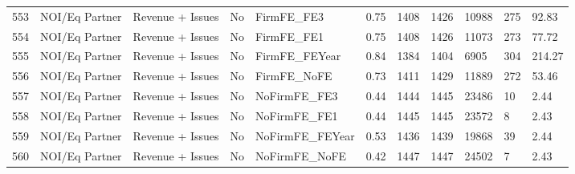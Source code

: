 \begin{table}[ht]
\begin{tabular}{rllllllllll}
  553 & NOI/Eq Partner & Revenue + Issues & No & FirmFE\_FE3 & 0.75 & 1408 & 1426 & 10988 & 275 & 92.83 \\ 
  554 & NOI/Eq Partner & Revenue + Issues & No & FirmFE\_FE1 & 0.75 & 1408 & 1426 & 11073 & 273 & 77.72 \\ 
  555 & NOI/Eq Partner & Revenue + Issues & No & FirmFE\_FEYear & 0.84 & 1384 & 1404 & 6905 & 304 & 214.27 \\ 
  556 & NOI/Eq Partner & Revenue + Issues & No & FirmFE\_NoFE & 0.73 & 1411 & 1429 & 11889 & 272 & 53.46 \\ 
  557 & NOI/Eq Partner & Revenue + Issues & No & NoFirmFE\_FE3 & 0.44 & 1444 & 1445 & 23486 & 10 & 2.44 \\ 
  558 & NOI/Eq Partner & Revenue + Issues & No & NoFirmFE\_FE1 & 0.44 & 1445 & 1445 & 23572 & 8 & 2.43 \\ 
  559 & NOI/Eq Partner & Revenue + Issues & No & NoFirmFE\_FEYear & 0.53 & 1436 & 1439 & 19868 & 39 & 2.44 \\ 
  560 & NOI/Eq Partner & Revenue + Issues & No & NoFirmFE\_NoFE & 0.42 & 1447 & 1447 & 24502 & 7 & 2.43 \\ 
   \hline
\end{tabular}
\end{table}
